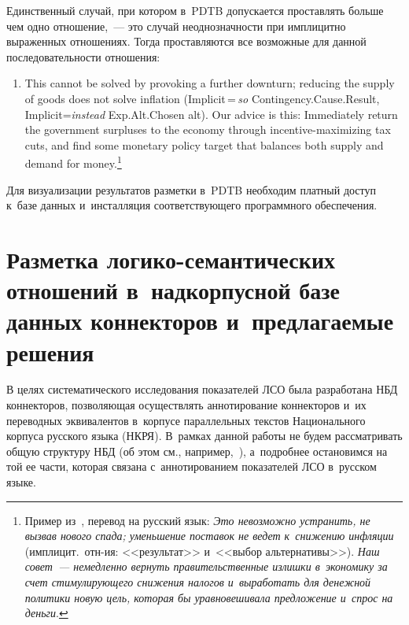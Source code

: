 \begin{multicols}{2}
  Единственный случай, при котором в~PDTB допускается проставлять больше 
чем одно отношение,~--- это случай неоднозначности при имплицитно 
выраженных отношениях. Тогда проставляются все возможные для данной 
последовательности отношения: 
  \begin{enumerate}[(1)]
\item This cannot be solved by provoking a further downturn; reducing the supply of goods does 
not solve inflation (Implicit\,=\,\textit{so} Contingency.Cause.Result, Implicit\;=\;\textit{instead} 
Exp.Alt.Chosen alt). Our advice is this: Immediately return the government surpluses to the 
economy through incentive-maximizing tax cuts, and find some monetary policy target that 
balances both supply and demand for money.\footnote{Пример из~\cite{9-in}, перевод на 
русский язык: \textit{Это невозможно устранить, не вызвав нового спада; уменьшение 
поставок не ведет к~снижению инфляции} (имплицит.\ отн-ия: <<результат>> и~<<выбор 
альтернативы>>). \textit{Наш совет~--- немедленно вернуть правительственные излишки 
в~экономику за счет стимулирующего снижения налогов и~выработать для денежной 
политики новую цель, которая бы уравновешивала предложение и~спрос на деньги}.}
\end{enumerate}

  Для визуализации результатов разметки в~PDTB необходим платный доступ 
к~базе данных и~инсталляция соответствующего программного обес\-пе\-чения.

\vspace*{-4pt}
  
\section{Разметка логико-семантических отношений в~надкорпусной
базе данных коннекторов и~предлагаемые 
решения}

  В целях систематического исследования показателей ЛСО была разработана 
НБД коннекторов, позволяющая осуществлять 
аннотирование коннекторов и~их переводных эквивалентов в~корпусе 
параллельных текстов Национального корпуса русского языка
(НКРЯ). В~рамках данной работы не будем рассматривать 
общую структуру НБД (об этом см., например,~\cite{10-in}), а~подробнее 
остановимся на той ее части, которая связана с~аннотированием показателей 
ЛСО в~русском языке.

    \begin{table*}[b]\small %
    \vspace*{-6pt}
  \begin{center}
  \vspace*{2ex}
  

\end{center}
\end{table*}
\end{multicols}
